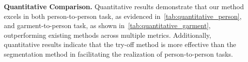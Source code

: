 

\noindent \textbf{Quantitative Comparison.}
Quantitative results demonstrate that our method excels in both person-to-person task, as evidenced in~\cref{tab:quantitative_person}, and garment-to-person task, as shown in~\cref{tab:quantitative_garment}, outperforming existing methods across multiple metrics. Additionally, quantitative results indicate that the try-off method is more effective than the segmentation method in facilitating the realization of person-to-person tasks.